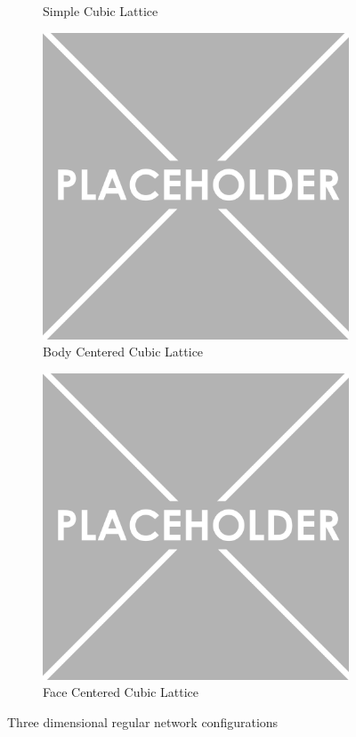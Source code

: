 \begin{figure}[p]
\begin{subfigure}[b]{0.45\textwidth}
    \caption{Simple Cubic Lattice}
    \label{fig:simple cubic lattice}
  \end{subfigure}
  \hfill
  \begin{subfigure}[b]{0.45\textwidth}
    \centering
    \includegraphics[width=\textwidth]{images/placeholder}
    \caption{Body Centered Cubic Lattice}
    \label{fig:body centered cubic lattice}
  \end{subfigure}
  \hfill
  \begin{subfigure}[b]{0.45\textwidth}
    \centering
    \includegraphics[width=\textwidth]{images/placeholder}
    \caption{Face Centered Cubic Lattice}
    \label{fig:face centered cubic lattice}
  \end{subfigure}
  \caption{Three dimensional regular network configurations}
  \label{fig:three dimensional networks}
\end{figure}
